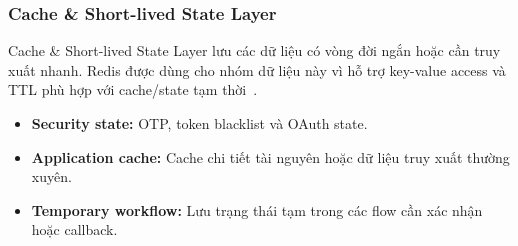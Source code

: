 \subsubsection{Cache \& Short-lived State Layer}
\label{subsubsec:cache-state-context}

Cache \& Short-lived State Layer lưu các dữ liệu có vòng đời ngắn hoặc cần truy xuất nhanh. Redis được dùng cho nhóm dữ liệu này vì hỗ trợ key-value access và TTL phù hợp với cache/state tạm thời~\cite{redisoverview}.

\begin{itemize}
    \item \textbf{Security state:} OTP, token blacklist và OAuth state.
    \item \textbf{Application cache:} Cache chi tiết tài nguyên hoặc dữ liệu truy xuất thường xuyên.
    \item \textbf{Temporary workflow:} Lưu trạng thái tạm trong các flow cần xác nhận hoặc callback.
\end{itemize}